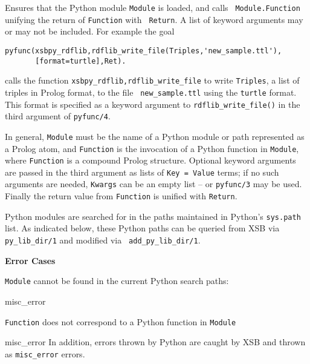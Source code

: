 \begin{description}

%
 Ensures that the Python module {\tt Module} is loaded, and calls {\tt
   Module.Function} unifying the return of {\tt Function} with {\tt
   Return}.  A list of keyword arguments may or may not be included.
 For example the goal

\begin{verbatim}
pyfunc(xsbpy_rdflib,rdflib_write_file(Triples,'new_sample.ttl'),
       [format=turtle],Ret).
\end{verbatim}

calls the function {\tt xsbpy\_rdflib,rdflib\_write\_file} to write
{\tt Triples}, a list of triples in Prolog format, to the file {\tt
  new\_sample.ttl} using the {\tt turtle} format.  This format is
specified as a keyword argument to {\tt rdflib\_write\_file()} in the
third argument of {\tt pyfunc/4}.

In general, {\tt Module} must be the name of a Python module or path
represented as a Prolog atom, and {\tt Function} is the invocation of
a Python function in {\tt Module}, where {\tt Function} is a compound
Prolog structure.  Optional keyword arguments are passed in the third
argument as lists of {\tt Key = Value} terms; if no such arguments are
needed, {\tt Kwargs} can be an empty list -- or {\tt pyfunc/3} may be
used.  Finally the return value from {\tt Function} is unified with
{\tt Return}.

Python modules are searched for in the paths maintained in Python's
{\tt sys.path} list.  As indicated below, these Python paths can be
queried from XSB via {\tt py\_lib\_dir/1} and modified via {\tt
  add\_py\_lib\_dir/1}.
     
{\bf Error Cases}
\bi
\item {\tt Module} cannot be found in the current Python search paths:
\bi
\item misc\_error
\ei
\item {\tt Function} does not correspond to a Python function in {\tt Module}
\bi
\item misc\_error
  \ei \ei
%
  In addition, errors thrown by Python are
  caught by XSB and thrown as {\tt misc\_error} errors.


\end{description}
